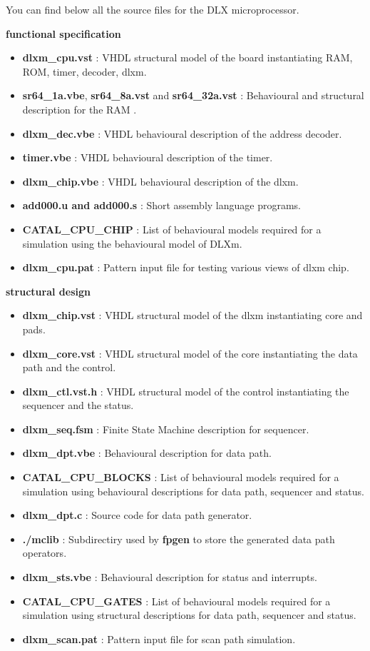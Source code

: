 You can find below all the source files for the DLX microprocessor.

\begin{center}
{\bf functional specification} 
\end{center}
\begin{itemize}
\item {\bf dlxm\_cpu.vst} : VHDL structural model of the board instantiating RAM, ROM, timer, decoder, dlxm. 
\item {\bf sr64\_1a.vbe}, 
{\bf sr64\_8a.vst}  and
{\bf sr64\_32a.vst} : Behavioural and structural description for the RAM .
\item {\bf dlxm\_dec.vbe}  : VHDL behavioural description of the address decoder.
\item {\bf timer.vbe}     : VHDL behavioural description of the timer.
\item {\bf dlxm\_chip.vbe}        : VHDL behavioural description of the dlxm.
\item {\bf add000.u and add000.s} : Short assembly language programs.
\item {\bf CATAL\_CPU\_CHIP}    : List of behavioural models required for a simulation using the behavioural
model of DLXm.
\item {\bf dlxm\_cpu.pat}   : Pattern input file for testing various
views of dlxm chip.
\end{itemize}

\begin{center}
{\bf structural design} 
\end{center}
\begin{itemize}
\item
{\bf dlxm\_chip.vst} : VHDL structural model of the dlxm instantiating core and pads.
\item
{\bf dlxm\_core.vst} : VHDL structural model of the core instantiating
the data path and the control.
\item
{\bf dlxm\_ctl.vst.h} : VHDL structural model of the control
instantiating the sequencer and the status.
\item
{\bf dlxm\_seq.fsm} : Finite State Machine description for sequencer.
\item {\bf dlxm\_dpt.vbe} : Behavioural description for data path.
\item {\bf CATAL\_CPU\_BLOCKS}    : List of behavioural models required for a simulation using 
behavioural descriptions  for data path, sequencer and status.
\item {\bf dlxm\_dpt.c}   : Source code for data path generator.
\item {\bf ./mclib } : Subdirectiry used by {\bf fpgen} to store
the generated data path operators.
\item {\bf dlxm\_sts.vbe} : Behavioural description for status and interrupts.
\item {\bf CATAL\_CPU\_GATES}    : List of behavioural models required for a simulation using 
structural descriptions for data path, sequencer and status.
\item {\bf dlxm\_scan.pat} : Pattern input file for scan path simulation.
\end{itemize}

